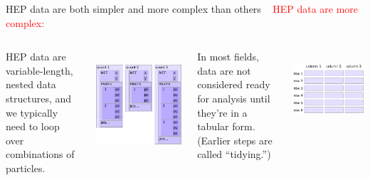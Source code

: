 \documentclass[aspectratio=169]{beamer}
\begin{document}
\begin{frame}{HEP data are both simpler and more complex than others}
\vspace{0.35 cm}
\mbox{ } \hfill \textcolor{red}{\LARGE HEP data are more complex:} \hfill \mbox{ }

\vspace{-0.25 cm}
\begin{columns}[t]

HEP data are variable-length, nested data structures, and we typically need to loop over combinations of particles.

\vspace{0.25 cm}
\mbox{ } \hfill \includegraphics[width=0.8\linewidth]{event-structure.pdf} \hfill \hfill \mbox{ }


In most fields, data are not considered ready for analysis until they're in a tabular form. (Earlier steps are called ``tidying.'')

\vspace{0.25 cm}
\mbox{ } \hfill \includegraphics[width=0.8\linewidth]{table-structure.pdf} \hfill \hfill \mbox{ }

\end{columns}
\end{frame}
\end{document}
